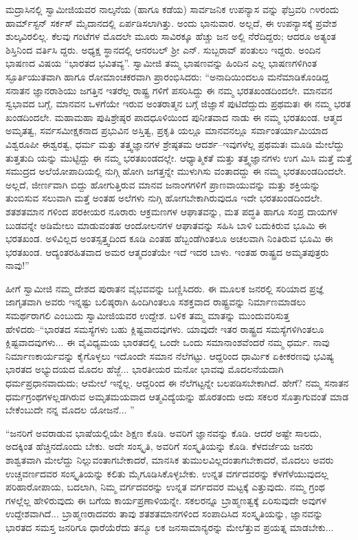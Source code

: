 ಮದ್ರಾಸಿನಲ್ಲಿ ಸ್ವಾಮೀಜಿಯವರ ನಾಲ್ಕನೆಯ (ಹಾಗೂ ಕಡೆಯ) ಸಾರ್ವಜನಿಕ ಉಪನ್ಯಾಸ ವನ್ನು ಫೆಬ್ರವರಿ ೧೪ರಂದು ಹಾರ್ಮ್​ಸ್ಟನ್ ಸರ್ಕಸ್ ಮೈದಾನದಲ್ಲಿ ಏರ್ಪಡಿಸಲಾಗಿತ್ತು. ಅಂದು ಭಾನುವಾರ. ಅಲ್ಲದೆ, ಈ ಉಪನ್ಯಾಸಕ್ಕೆ ಪ್ರವೇಶ ಶುಲ್ಕವಿರಲಿಲ್ಲ. ಕೆಲವು ಗಂಟೆಗಳ ಮೊದಲೇ ಮೂರು ಸಾವಿರಕ್ಕೂ ಹೆಚ್ಚು ಜನ ಅಲ್ಲಿ ನೆರೆದಿದ್ದರು; ಆದರೂ ಅತ್ಯಂತ ಶಿಸ್ತಿನಿಂದ ವರ್ತಿಸಿ ದ್ದರು. ಅಧ್ಯಕ್ಷ ಸ್ಥಾನದಲ್ಲಿ ಆನರಬಲ್ ಶ್ರೀ ಎನ್. ಸುಬ್ಬರಾವ್ ಪಂತುಲು ಇದ್ದರು. ಅಂದಿನ ಭಾಷಣದ ವಿಷಯ “ಭಾರತದ ಭವಿತವ್ಯ”. ಸ್ವಾಮೀಜಿ ತಮ್ಮ ಭಾಷಣವನ್ನು ಹಿಂದಿನ ಎಲ್ಲ ಭಾಷಣಗಳಿಗಿಂತ ಸ್ಫೂರ್ತಿಯುತವಾಗಿ ಹಾಗೂ ರೋಮಾಂಚಕರವಾಗಿ ಪ್ರಾರಂಭಿಸಿದರು: “ಅನಾದಿಯಿಂದಲೂ ಮನೆಮಾಡಿಕೊಂಡಿದ್ದ ಸನಾತನ ಜ್ಞಾನರಾಶಿಯು ಜಗತ್ತಿನ ಇತರೆಲ್ಲ ರಾಷ್ಟ್ರ ಗಳಿಗೆ ಪಸರಿಸಿದ್ದು ಈ ನಮ್ಮ ಭರತಖಂಡದಿಂದಲೇ. ಮಾನವನ ಸ್ವಭಾವದ ಬಗ್ಗೆ, ಮಾನವನ ಒಳಗೆಯೇ ಇರುವ ಅಂತರಾತ್ಮನ ಬಗ್ಗೆ ಜಿಜ್ಞಾಸೆ ಪುಟಿದೆದ್ದುದು ಪ್ರಥಮತಃ ಈ ನಮ್ಮ ಭರತ ಖಂಡದಿಂದಲೇ. ಮಹಾಮಹಾ ಪುಷಿಶ್ರೇಷ್ಠರ ಪಾದಧೂಳಿಯಿಂದ ಪುನೀತವಾದ ನಾಡು ಈ ನಮ್ಮ ಭರತಖಂಡ. ಆತ್ಮದ ಅಮೃತತ್ವ, ಸರ್ವಸಮೀಕ್ಷಕನಾದ ಪ್ರಭುವಿನ ಅಸ್ತಿತ್ವ, ಪ್ರಕೃತಿ ಯಲ್ಲೂ ಮಾನವನಲ್ಲೂ ಸರ್ವಾಂತರ್ಯಾಮಿಯಾದ ವಿಶ್ವರೂಪೀ ಈಶ್ವರತ್ವ, ಧರ್ಮ ಮತ್ತು ತತ್ತ್ವಜ್ಞಾನಗಳ ಶ್ರೇಷ್ಠತಮ ಆದರ್ಶ–ಇವುಗಳೆಲ್ಲ ಪ್ರಥಮತಃ ಮೂಡಿ ಮೇಲೆದ್ದು ತುತ್ತತುದಿ ಯನ್ನು ಮುಟ್ಟಿದ್ದು ಈ ನಮ್ಮ ಭರತಖಂಡದಲ್ಲೇ. ಆಧ್ಯಾತ್ಮಿಕತೆ ಮತ್ತು ತತ್ತ್ವಜ್ಞಾನಗಳು ಉಗ ಮಿಸಿ ಮತ್ತೆ ಮತ್ತೆ ಸಮುದ್ರದ ಅಲೆಯೋಪಾದಿಯಲ್ಲಿ ನುಗ್ಗಿ ಹೋಗಿ ಜಗತ್ತನ್ನೇ ಮುಳುಗಿಸು ವಂತಾದದ್ದು ಈ ನಮ್ಮ ಭರತಖಂಡದಿಂದಲೇ. ಅಲ್ಲದೆ, ಜೀರ್ಣವಾಗಿ ಬಿದ್ದು ಹೋಗುತ್ತಿರುವ ಮಾನವ ಜನಾಂಗಗಳಿಗೆ ಪ್ರಾಣವಾಯುವನ್ನು ಮತ್ತು ಶಕ್ತಿಯನ್ನು ತುಂಬಿಸುವ ಸಲುವಾಗಿ ಮತ್ತೆ ಅಂತಹ ಅಲೆಗಳು ನುಗ್ಗಿ ಹೋಗಬೇಕಾಗಿರುವುದೂ ಇದೇ ಭರತಖಂಡದಿಂದಲೇ. ಶತಶತಮಾನ ಗಳಿಂದ ಪರಕೀಯರ ನೂರಾರು ಆಕ್ರಮಣಗಳ ಆಘಾತವನ್ನು, ಮತ ಪದ್ಧತಿ ಹಾಗೂ ಸಂಪ್ರ ದಾಯಗಳ ಬುಡವನ್ನೇ ಅಡಿಮೇಲು ಮಾಡುವಂತಹ ಆಂದೋಲನಗಳ ಆಘಾತವನ್ನು ಸಹಿಸಿ ಬಾಳಿ ಬದುಕಿರುವ ಭೂಮಿ ಈ ಭರತಖಂಡ. ಅಳಿವಿಲ್ಲದ ಅಂತಸ್ಸತ್ತ್ವದಿಂದ ಕೂಡಿ ಎಂತಹ ಹೆಬ್ಬಂಡೆಗಿಂತಲೂ ಅಚಲವಾಗಿ ನಿಂತಿರುವ ಭೂಮಿ ಈ ಭರತಖಂಡ. ಆದ್ಯಂತರಹಿತವಾದ ಅಮರ ಆತ್ಮದಂತೆಯೇ ಇದೆ ಇದರ ಬಾಳು. ಇಂತಹ ರಾಷ್ಟ್ರದ ಅಮೃತಪುತ್ರರು ನಾವು!”

ಹೀಗೆ ಸ್ವಾಮೀಜಿ ನಮ್ಮ ದೇಶದ ಪುರಾತನ ವೈಭವವನ್ನು ಬಣ್ಣಿಸಿದರು. ಈ ಮೂಲಕ ಜನರಲ್ಲಿ ಸರಿಯಾದ ಪ್ರಜ್ಞೆ ಜಾಗೃತವಾಗಿ ಅವರು ಇನ್ನಷ್ಟು ಬಲಿಷ್ಠರಾಗಿ ಹಿಂದಿಗಿಂತಲೂ ಸಶಕ್ತವಾದ ರಾಷ್ಟ್ರವನ್ನು ನಿರ್ಮಾಣಮಾಡಲು ಸಮರ್ಥರಾಗಲಿ ಎಂಬುದು ಸ್ವಾಮೀಜಿಯವರ ಉದ್ದೇಶ. ಬಳಿಕ ತಮ್ಮ ಮಾತನ್ನು ಮುಂದುವರಿಸುತ್ತ ಹೇಳಿದರು–“ಭಾರತದ ಸಮಸ್ಯೆಗಳು ಬಹು ಕ್ಲಿಷ್ಟವಾದವುಗಳು. ಯಾವುದೇ ಇತರ ರಾಷ್ಟ್ರದ ಸಮಸ್ಯೆಗಳಿಗಿಂತಲೂ ಕ್ಲಿಷ್ಟವಾದವುಗಳು... ಈ ವೈವಿಧ್ಯಮಯ ಭಾರತದಲ್ಲಿ ಒಂದೇ ಒಂದು ಸಮಾನಾಂಶವೆಂದರೆ ನಮ್ಮ ಧರ್ಮ. ನಾವು ನಿರ್ಮಾಣಕಾರ್ಯವನ್ನು ಕೈಗೊಳ್ಳಲು ಇದೊಂದೇ ಸಮಾನ ನೆಲೆಗಟ್ಟು. ಆದ್ದರಿಂದ ಧಾರ್ಮಿಕ ಏಕೀಕರಣವು ಭವಿಷ್ಯ ಭಾರತದ ಅಭ್ಯುದಯದ ಮೊದಲ ಹೆಜ್ಜೆ... ಭಾರತೀಯರ ಮನೋ ಭಾವವು ಮೊದಲನೆಯದಾಗಿ ಧರ್ಮಪ್ರಧಾನವಾದುದು; ಆಮೇಲೆ ಇನ್ನೆಲ್ಲ. ಆದ್ದರಿಂದ ಈ ನೆಲೆಗಟ್ಟನ್ನೇ ಬಲಪಡಿಸಬೇಕಾಗಿದೆ. ಹೇಗೆ? ನಮ್ಮ ಸನಾತನ ಧರ್ಮಗ್ರಂಥಗಳಲ್ಲಡಗಿರುವ ಅಮೃತಮಯವಾದ ಆತ್ಮವಿದ್ಯೆಯನ್ನು ಹೊರತಂದು ಅದು ಸಕಲರ ಸೊತ್ತಾಗುವಂತೆ ಮಾಡ ಬೇಕೆಂಬುದೇ ನನ್ನ ಮೊದಲ ಯೋಜನೆ... ”

“ಜನರಿಗೆ ಅವರಾಡುವ ಭಾಷೆಯಲ್ಲಿಯೇ ಶಿಕ್ಷಣ ಕೊಡಿ. ಅವರಿಗೆ ಜ್ಞಾನವನ್ನು ಕೊಡಿ. ಆದರೆ ಅಷ್ಟೇ ಸಾಲದು, ಅದಕ್ಕಿಂತ ಹೆಚ್ಚಿನದೊಂದು ಬೇಕು. ಅದೇ ಸಂಸ್ಕೃತಿ, ಅವರಿಗೆ ಸಂಸ್ಕೃತಿಯನ್ನು ಕೊಡಿ. ಕೆಳದರ್ಜೆಯ ಜನರು ಶಾಶ್ವತವಾಗಿ ಮೇಲೆದ್ದು ನಿಲ್ಲುವಂತಾಗಬೇಕಾದರೆ, ಮಾನಸಿಕ ತುಮುಲವಿಲ್ಲದಂತಾಗಬೇಕಾದರೆ, ಮೊದಲು ಅವರು ಉಚ್ಚವರ್ಣದವರ ಸಂಸ್ಕೃತಿಯನ್ನು ಕಲಿತು ಮೈಗೂಡಿಸಿಕೊಳ್ಳಬೇಕು. ಉನ್ನತ ವರ್ಗದವರನ್ನು ಕೆಳಗೆಳೆಯುವುದಲ್ಲ ಪರಿಹಾರೋಪಾಯ, ಬದಲಾಗಿ, ನಿಮ್ಮ ವರ್ಗದವರನ್ನು ಉನ್ನತ ವರ್ಗದವರ ಮಟ್ಟಕ್ಕೆ ಎತ್ತುವುದು. ನಮ್ಮ ಗ್ರಂಥ ಗಳಲ್ಲೆಲ್ಲ ಹೇಳಿರುವುದು ಈ ಬಗೆಯ ಕಾರ್ಯಪ್ರಣಾಳಿಯನ್ನೇ. ಸಕಲರನ್ನೂ ಬ್ರಾಹ್ಮಣತ್ವಕ್ಕೆ ಏರಿಸುವುದೇ ಅವುಗಳ ಉದ್ದೇಶವಾಗಿದೆ... ಬ್ರಾಹ್ಮಣರಾದವರು ತಾವು ಶತಶತಮಾನಗಳಿಂದ ಸಂಪಾದಿಸಿದ ಸಂಸ್ಕೃತಿಯನ್ನು, ಜ್ಞಾನವನ್ನು ಭಾರತದ ಸಮಸ್ತ ಜನರಿಗೂ ಧಾರೆಯೆರೆದು ತನ್ಮೂ ಲಕ ಜನಸಾಮಾನ್ಯರನ್ನು ಮೇಲೆತ್ತುವ ಪ್ರಯತ್ನ ಮಾಡಬೇಕು... 

